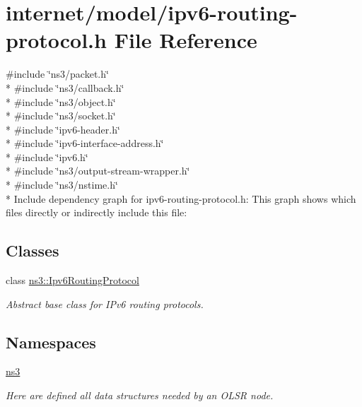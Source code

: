\hypertarget{ipv6-routing-protocol_8h}{}\section{internet/model/ipv6-\/routing-\/protocol.h File Reference}
\label{ipv6-routing-protocol_8h}
{\ttfamily \#include \char`\"{}ns3/packet.\+h\char`\"{}}\\*
{\ttfamily \#include \char`\"{}ns3/callback.\+h\char`\"{}}\\*
{\ttfamily \#include \char`\"{}ns3/object.\+h\char`\"{}}\\*
{\ttfamily \#include \char`\"{}ns3/socket.\+h\char`\"{}}\\*
{\ttfamily \#include \char`\"{}ipv6-\/header.\+h\char`\"{}}\\*
{\ttfamily \#include \char`\"{}ipv6-\/interface-\/address.\+h\char`\"{}}\\*
{\ttfamily \#include \char`\"{}ipv6.\+h\char`\"{}}\\*
{\ttfamily \#include \char`\"{}ns3/output-\/stream-\/wrapper.\+h\char`\"{}}\\*
{\ttfamily \#include \char`\"{}ns3/nstime.\+h\char`\"{}}\\*
Include dependency graph for ipv6-\/routing-\/protocol.h\+:
This graph shows which files directly or indirectly include this file\+:
\subsection*{Classes}
\begin{DoxyCompactItemize}
\item 
class \hyperlink{classns3_1_1Ipv6RoutingProtocol}{ns3\+::\+Ipv6\+Routing\+Protocol}
\begin{DoxyCompactList}\small\item\em Abstract base class for I\+Pv6 routing protocols. \end{DoxyCompactList}\end{DoxyCompactItemize}
\subsection*{Namespaces}
\begin{DoxyCompactItemize}
\item 
 \hyperlink{namespacens3}{ns3}
\begin{DoxyCompactList}\small\item\em Here are defined all data structures needed by an O\+L\+SR node. \end{DoxyCompactList}\end{DoxyCompactItemize}
